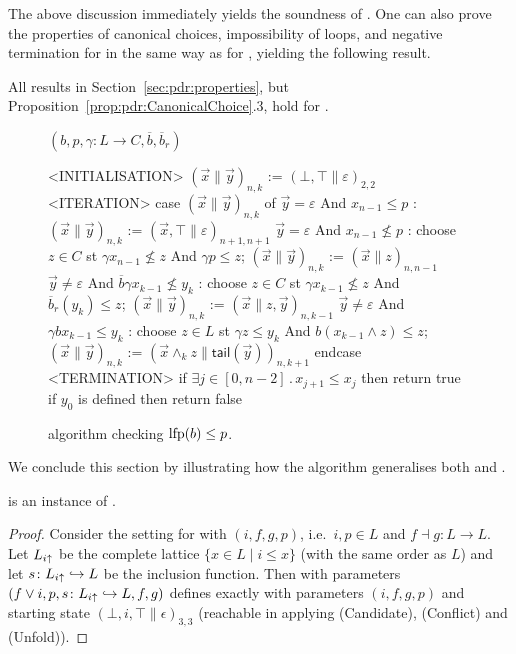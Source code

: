 The above discussion immediately yields the soundness of \APDRAI. One can also prove the properties of canonical choices, impossibility of loops, and negative termination for \APDRAI{} in the same way as for \ADPDR{}, yielding the following result.
\begin{theorem}
	All results in Section~\ref{sec:pdr:properties}, but Proposition~\ref{prop:pdr:CanonicalChoice}.3, hold for \APDRAI{}.
\end{theorem}

\begin{figure}[t]
	\centering
	\underline{{\APDRAI} $(b,p, \gamma\colon L \to C, \overline{b}, \overline{b}_r)$}
	\begin{codeNT}
<INITIALISATION>
  $( \vec{x} \| \vec{y} )_{n,k}$ := $(\bot,\top\|\varepsilon)_{2,2}$
<ITERATION>			                %
  case $( \vec{x} \| \vec{y} )_{n,k}$ of
	  $\vec{y}=\varepsilon$ And $x_{n-1} \le p$     :                    %
		$( \vec{x} \| \vec{y} )_{n,k}$ := $( \vec{x}, \top \| \varepsilon )_{n+1,n+1}$
	  $\vec{y}=\varepsilon$ And $x_{n-1} \not \le p$    :                     %
		choose $z\in C$ st $\gamma x_{n-1} \not \le z$ And  $\gamma p \le z$;
		$( \vec{x} \| \vec{y} )_{n,k}$ := $( \vec{x} \| z )_{n,n-1}$
	  $\vec{y} \neq \varepsilon$ And $\overline{b}\gamma x_{k-1} \not \le y_k$ :                        %
		choose $z \in C$ st $\gamma x_{k-1} \not \le z$ And $\overline{b}_r(y_k) \le z$;
		$(\vec{x} \| \vec{y} )_{n,k}$ := $(\vec{x} \| z , \vec{y} )_{n,k-1}$
	  $\vec{y} \neq \varepsilon$ And $\gamma b x_{k-1} \le y_k$ :                        %
		choose $z \in L$ st $\gamma z \le y_k$ And $b(x_{k-1} \land z) \le z$;
		$(\vec{x} \| \vec{y} )_{n,k}$ := $(\vec{x} \land_k z \| \mathsf{tail}(\vec{y}) )_{n,k+1}$
  endcase
<TERMINATION>
  if $\exists j\in [0,n-2]\,.\, x_{j+1} \le x_j$ then return true		 %
  if $y_0$ is defined then return false	  	%
\end{codeNT}
	\caption{{\APDRAI} algorithm checking $\text{lfp} (b) \le p$.}\label{fig:pdr:adjai}
\end{figure}

We conclude this section by illustrating how the algorithm \APDRAI{} generalises both \APDR{} and \ADPDR{}.
\begin{prop}\label{prop:pdr:instanceAI}
	\APDR{} is an instance of \APDRAI{}.
\end{prop}
\begin{proof}
	Consider the setting for \APDR with $(i, f, g, p)$, i.e.~$i, p \in L$ and $f \dashv g \colon L \to L$. Let $L_{i \uparrow}$ be the complete lattice $\{ x \in L \mid i \le x \}$ (with the same order as $L$) and let $s \colon L_{i \uparrow} \hookrightarrow L$ be the inclusion function. Then \APDRAI with parameters $(f \lor i, p, s\colon L_{i \uparrow} \hookrightarrow L, f, g)$ defines exactly \APDR{} with parameters $(i, f, g, p)$ and starting state $(\bot, i, \top \| \epsilon)_{3, 3}$ (reachable in \APDR{} applying (Candidate), (Conflict) and (Unfold)).
\end{proof}

